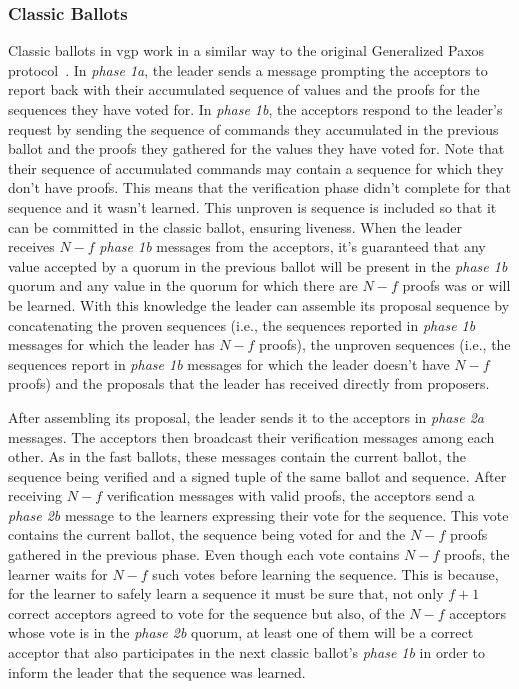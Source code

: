 \subsubsection{Classic Ballots}
Classic ballots in \acrshort{vgp} work in a similar way to the original Generalized Paxos protocol~\cite{Lamport2005}. In \textit{phase 1a}, the leader sends a message prompting the acceptors to report back with their accumulated sequence of values and the proofs for the sequences they have voted for. In \textit{phase 1b}, the acceptors respond to the leader's request by sending the sequence of commands they accumulated in the previous ballot and the proofs they gathered for the values they have voted for. Note that their sequence of accumulated commands may contain a sequence for which they don't have proofs. This means that the verification phase didn't complete for that sequence and it wasn't learned. This unproven is sequence is included so that it can be committed in the classic ballot, ensuring liveness. When the leader receives $N-f$ \textit{phase 1b} messages from the acceptors, it's guaranteed that any value accepted by a quorum in the previous ballot will be present in the \textit{phase 1b} quorum and any value in the quorum for which there are $N-f$ proofs was or will be learned. With this knowledge the leader can assemble its proposal sequence by concatenating the proven sequences (i.e., the sequences reported in \textit{phase 1b} messages for which the leader has $N-f$ proofs), the unproven sequences  (i.e., the sequences report in \textit{phase 1b} messages for which the leader doesn't have $N-f$ proofs) and the proposals that the leader has received directly from proposers. \par
After assembling its proposal, the leader sends it to the acceptors in \textit{phase 2a} messages. The acceptors then broadcast their verification messages among each other. As in the fast ballots, these messages contain the current ballot, the sequence being verified and a signed tuple of the same ballot and sequence. After receiving $N-f$ verification messages with valid proofs, the acceptors send a \textit{phase 2b} message to the learners expressing their vote for the sequence. This vote contains the current ballot, the sequence being voted for and the $N-f$ proofs gathered in the previous phase. Even though each vote contains $N-f$ proofs, the learner waits for $N-f$ such votes before learning the sequence. This is because, for the learner to safely learn a sequence it must be sure that, not only $f+1$ correct acceptors agreed to vote for the sequence but also, of the $N-f$ acceptors whose vote is in the \textit{phase 2b} quorum, at least one of them will be a correct acceptor that also participates in the next classic ballot's \textit{phase 1b} in order to inform the leader that the sequence was learned.

